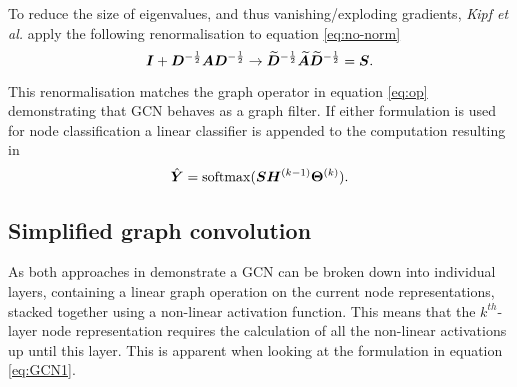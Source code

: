 To reduce the size of eigenvalues, and thus vanishing/exploding gradients, \textit{Kipf et al.}\cite{kipf2016semi} apply the following renormalisation to equation \ref{eq:no-norm} 
\begin{equation}
    \label{eq:norm}
    {\bm{I}} + {\bm{D}}^{-\frac12}{\bm{A}}{\bm{D}}^{-\frac12} \to \widetilde{{\bm{D}}}^{-\frac12}\widetilde{{\bm{A}}}\widetilde{{\bm{D}}}^{-\frac12} = {\bm{S}}.
\end{equation}

This renormalisation matches the graph operator in equation \ref{eq:op} demonstrating that GCN behaves as a graph filter.
If either formulation is used for node classification a linear classifier is appended to the computation resulting in 
\begin{equation}
    \label{eq:cls}
    \hat{{\bm{Y}}} = \operatorname{softmax}({\bm{S}}{\bm{H}}^{(k-1)}\bm{\Theta}^{(k)}).
\end{equation}







\subsection{Simplified graph convolution}
\label{sec:SGC}



As both approaches in  demonstrate a GCN can be broken down into individual layers, containing a linear graph operation on the current node representations, stacked together using a non-linear activation function.
This means that the $k^{th}$-layer node representation requires the calculation of all the non-linear activations up until this layer.
This is apparent when looking at the formulation in equation \ref{eq:GCN1}.

